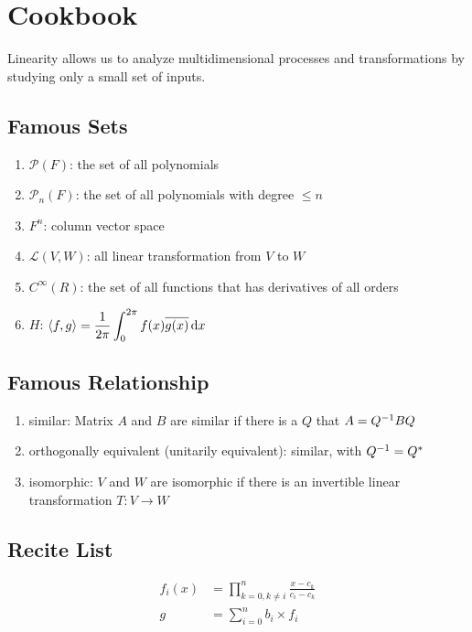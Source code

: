 \chapter{Cookbook}

Linearity allows us to analyze multidimensional processes and transformations by studying only a small set of inputs.

\section{Famous Sets}

\begin{enumerate}
    \item $\mathcal{P}(F)$: the set of all polynomials
    \item $\mathcal{P}_n (F)$: the set of all polynomials with degree $\leq n$
    \item $F^n$: column vector space
    \item $\mathcal{L}(V,W)$: all linear transformation from $V$ to $W$
    \item $C^\infty (R)$: the set of all functions that has derivatives of all orders
    \item $H$: $\displaystyle \innerproduct{f}{g} = \frac{1}{2 \pi} \int_{0}^{2\pi} f(x) \conjugate{g(x)} \dif x$
\end{enumerate}

\section{Famous Relationship}
\begin{enumerate}
    \item similar: Matrix $A$ and $B$ are similar if there is a $Q$ that $A = {Q}^{-1} B Q$
    \item orthogonally equivalent (unitarily equivalent): similar, with ${Q}^{-1} = Q^*$
    \item isomorphic: $V$ and $W$ are isomorphic if there is an invertible linear transformation $T:V \rightarrow W$
\end{enumerate}




\section{Recite List}

\begin{example}
    \begin{equation*}
    \begin{aligned}
        f_i(x) &= \prod_{k=0,k \neq i}^{n} \frac{x - c_k}{c_i - c_k} \\
        g &= \sum_{i=0}^{n} b_i \times f_i
    \end{aligned}
    \end{equation*}
\end{example}


